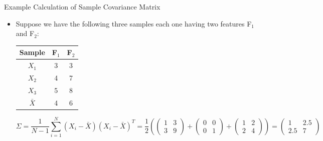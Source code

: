 \documentclass[serif, aspectratio=169]{beamer}
\begin{document}



\begin{frame}{Example Calculation of Sample Covariance Matrix}
    \begin{itemize}         
        \item Suppose we have the following three samples each one having two features F$_1$ and F$_2$:
\begin{center}
     \begin{tabular}{|c|c|c|}
        \hline
        \textbf{Sample} & \textbf{F$_1$} & \textbf{F$_2$} \\
        \hline
        $X_1$ & 3 & 3 \\
        \hline
        $X_2$ & 4 & 7 \\
        \hline
        $X_3$ & 5 & 8 \\
        \hline
        $\bar{X}$ & 4 & 6 \\
        \hline
        \end{tabular}
\end{center}
     
     $$\Sigma =  \frac{1}{N-1} \sum_{i=1}^{N} (X_i - \bar{X})(X_i - \bar{X})^T =  \frac{1}{2} (\begin{pmatrix}
1 & 3  \\
3 & 9 
\end{pmatrix}  + \begin{pmatrix}
0 & 0  \\
0 & 1 
\end{pmatrix} + \begin{pmatrix}
1 & 2  \\
2 & 4 
\end{pmatrix}) =  \begin{pmatrix}
1 & 2.5  \\
2.5 & 7 
\end{pmatrix} $$
    \end{itemize}
\end{frame}
\end{document}
